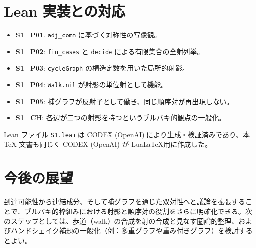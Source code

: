 \documentclass[a4paper]{ltjsarticle}
\theoremstyle{definition}
\theoremstyle{plain}
\begin{document}
\section{Lean 実装との対応}
\begin{itemize}[leftmargin=2em]
  \item \textbf{S1\_P01}: \verb|adj_comm| に基づく対称性の写像観。
  \item \textbf{S1\_P02}: \verb|fin_cases| と \verb|decide| による有限集合の全射列挙。
  \item \textbf{S1\_P03}: \verb|cycleGraph| の構造定数を用いた局所的射影。
  \item \textbf{S1\_P04}: \verb|Walk.nil| が射影の単位射として機能。
  \item \textbf{S1\_P05}: 補グラフが反射子として働き、同じ順序対が再出現しない。
  \item \textbf{S1\_CH}: 各辺が二つの射影を持つというブルバキ的観点の一般化。
\end{itemize}

Lean ファイル \texttt{S1.lean} は CODEX (OpenAI) により生成・検証済みであり、本 TeX 文書も同じく CODEX (OpenAI) が Lua\LaTeX 用に作成した。

\section{今後の展望}
到達可能性から連結成分、そして補グラフを通じた双対性へと議論を拡張することで、ブルバキ的枠組みにおける射影と順序対の役割をさらに明確化できる。次のステップとしては、歩道（walk）の合成を射の合成と見なす圏論的整理、およびハンドシェイク補題の一般化（例：多重グラフや重み付きグラフ）を検討するとよい。
\end{document}
